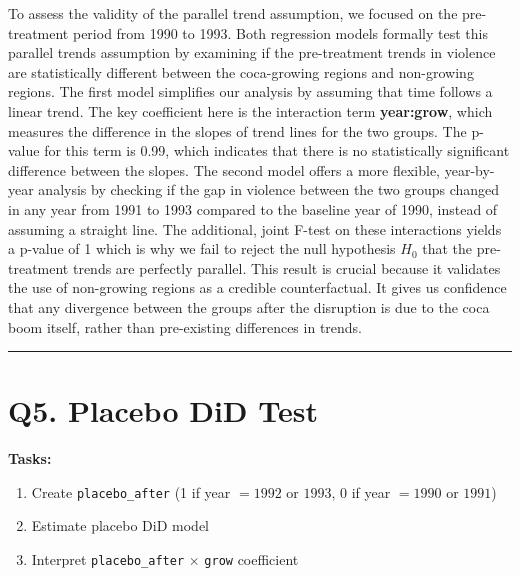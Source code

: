 \documentclass[
]{article}
\providecommand{\tightlist}{%
  \setlength{\itemsep}{0pt}\setlength{\parskip}{0pt}}
\begin{document}
To assess the validity of the parallel trend assumption, we focused on
the pre-treatment period from 1990 to 1993. Both regression models
formally test this parallel trends assumption by examining if the
pre-treatment trends in violence are statistically different between the
coca-growing regions and non-growing regions. The first model simplifies
our analysis by assuming that time follows a linear trend. The key
coefficient here is the interaction term \textbf{year:grow}, which
measures the difference in the slopes of trend lines for the two groups.
The p-value for this term is 0.99, which indicates that there is no
statistically significant difference between the slopes. The second
model offers a more flexible, year-by-year analysis by checking if the
gap in violence between the two groups changed in any year from 1991 to
1993 compared to the baseline year of 1990, instead of assuming a
straight line. The additional, joint F-test on these interactions yields
a p-value of 1 which is why we fail to reject the null hypothesis
\(H_0\) that the pre-treatment trends are perfectly parallel. This
result is crucial because it validates the use of non-growing regions as
a credible counterfactual. It gives us confidence that any divergence
between the groups after the disruption is due to the coca boom itself,
rather than pre-existing differences in trends.

\begin{center}\rule{0.5\linewidth}{0.5pt}\end{center}

\section{Q5. Placebo DiD Test}\label{q5.-placebo-did-test}

\textbf{Tasks:}

\begin{enumerate}
\def\labelenumi{\arabic{enumi}.}
\tightlist
\item
  Create \texttt{placebo\_after} (1 if year \(= 1992\) or \(1993\), 0 if
  year \(= 1990\) or \(1991\))
\item
  Estimate placebo DiD model
\item
  Interpret \texttt{placebo\_after} \(\times\) \texttt{grow} coefficient
\end{enumerate}
\end{document}
